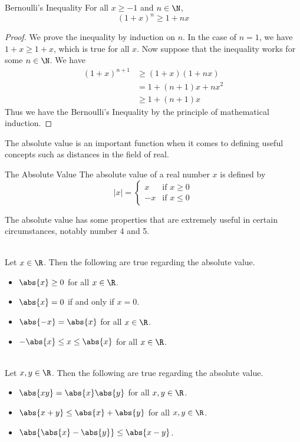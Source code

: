 \documentclass[a4paper]{article}
\begin{document}
\begin{thm}{Bernoulli's Inequality}{} For all $x\geq-1$ and $n\in\N$, $$(1+x)^n\geq1+nx$$
\begin{proof} We prove the inequality by induction on $n$. In the case of $n=1$, we have $1+x\geq1+x$, which is true for all $x$. Now suppose that the inequality works for some $n\in\N$. We have 
\begin{align*}
(1+x)^{n+1}&\geq(1+x)(1+nx) \tag{Induction Hypothesis and $x\geq-1$} \\
&=1+(n+1)x+nx^2 \\
&\geq1+(n+1)x \tag{since $x^2\geq0$}
\end{align*}
Thus we have the Bernoulli's Inequality by the principle of mathematical induction. 
\end{proof}
\end{thm}

The absolute value is an important function when it comes to defining useful concepts such as distances in the field of real. 

\begin{defn}{The Absolute Value}{} The absolute value of a real number $x$ is defined by
$$|x|=\begin{cases}
x & \text{if $x\geq0$} \\
-x & \text{if $x\leq0$}
\end{cases}$$
\end{defn}

The absolute value has some properties that are extremely useful in certain circumstances, notably number 4 and 5. 

\begin{lmm}{}{}\\
Let $x\in\R$. Then the following are true regarding the absolute value. 
\begin{itemize}
\item $\abs{x}\geq 0$ for all $x\in\R$. 
\item $\abs{x}=0$ if and only if $x=0$. 
\item $\abs{-x}=\abs{x}$ for all $x\in\R$. 
\item $-\abs{x}\leq x\leq\abs{x}$ for all $x\in\R$. 
\end{itemize}
\end{lmm}

\begin{lmm}{}{}\\
Let $x,y\in\R$. Then the following are true regarding the absolute value. 
\begin{itemize}
\item $\abs{xy}=\abs{x}\abs{y}$ for all $x,y\in\R$. 
\item $\abs{x+y}\leq\abs{x}+\abs{y}$ for all $x,y\in\R$. 
\item $\abs{\abs{x}-\abs{y}}\leq\abs{x-y}$. 
\end{itemize}
\end{lmm}
\end{document}
